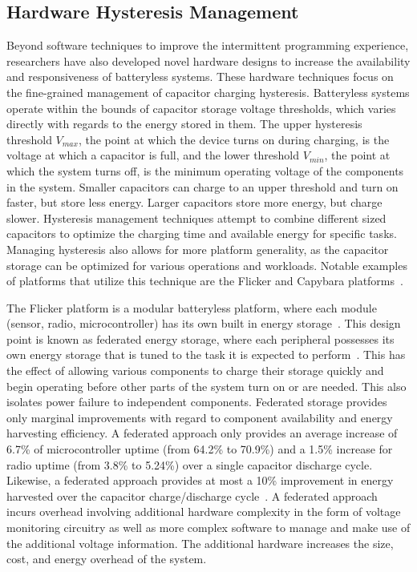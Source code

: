\subsection{Hardware Hysteresis Management}
Beyond software techniques to improve the intermittent programming experience,
researchers have also developed novel hardware designs to
increase the availability and responsiveness of batteryless systems. These hardware techniques focus on the fine-grained management
of capacitor charging hysteresis.
Batteryless systems operate within the bounds of capacitor storage voltage thresholds, which varies directly with regards to the energy stored in them. The
upper hysteresis threshold $V_{max}$, the point at which the device turns on during charging, is the voltage at which a capacitor is full, and the lower threshold $V_{min}$, the point at which the system turns off, is the minimum
operating voltage of the components in the system.
Smaller capacitors can charge to an upper
threshold and turn on faster, but store less energy.  Larger capacitors store more energy, but charge slower.
Hysteresis management
techniques attempt to combine different sized capacitors to
optimize the charging time and available energy for specific tasks.
Managing hysteresis also allows for more platform generality, as the capacitor storage can be optimized for various operations and workloads.
Notable examples of platforms that utilize this technique are the Flicker and Capybara platforms~\cite{hesterFlicker17, colinReconfigurable18}.

The Flicker
platform is a modular batteryless platform, where each module (sensor, radio, microcontroller) has its own built in energy storage~\cite{hesterFlicker17}. This design point is known as federated energy storage, where each peripheral possesses its own energy storage that is tuned to the task
it is expected to perform~\cite{hesterTragedy15}. This has the
effect of allowing various components to charge their storage quickly and begin operating before other parts of the system turn on or are needed. This also
isolates power failure to independent components.
Federated storage provides only marginal improvements with regard to component availability and energy harvesting efficiency. A federated approach only provides an average increase of 6.7\% of microcontroller uptime (from 64.2\% to 70.9\%) and a 1.5\% increase for radio uptime (from 3.8\% to 5.24\%) over a single capacitor discharge cycle. Likewise, a federated approach provides at most a 10\% improvement in energy harvested over the capacitor charge/discharge cycle~\cite{hesterTragedy15}.
A federated approach incurs overhead involving additional hardware complexity in the form of voltage monitoring circuitry as well as more complex software to manage and make use of the additional voltage information. The additional hardware increases the size, cost, and energy overhead of the system.

